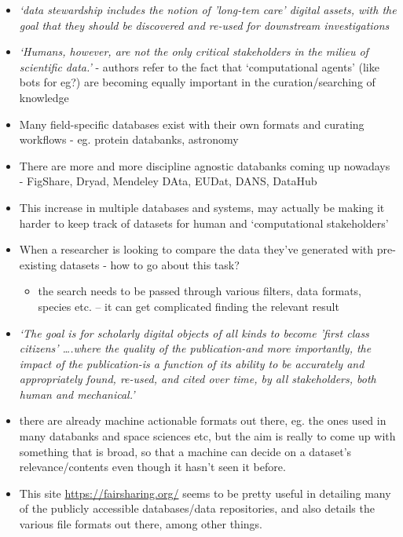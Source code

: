 \documentclass[
]{book}
\providecommand{\tightlist}{%
  \setlength{\itemsep}{0pt}\setlength{\parskip}{0pt}}
\begin{document}
\begin{itemize}
\tightlist
\item
  \emph{`data stewardship includes the notion of 'long-tem care' digital assets, with the goal that they should be discovered and re-used for downstream investigations}
\item
  \emph{`Humans, however, are not the only critical stakeholders in the milieu of scientific data.'} - authors refer to the fact that `computational agents' (like bots for eg?) are becoming equally important in the curation/searching of knowledge
\item
  Many field-specific databases exist with their own formats and curating workflows - eg. protein databanks, astronomy
\item
  There are more and more discipline agnostic databanks coming up nowadays - FigShare, Dryad, Mendeley DAta, EUDat, DANS, DataHub
\item
  This increase in multiple databases and systems, may actually be making it harder to keep track of datasets for human and `computational stakeholders'
\item
  When a researcher is looking to compare the data they've generated with pre-existing datasets - how to go about this task?

  \begin{itemize}
  \tightlist
  \item
    the search needs to be passed through various filters, data formats, species etc. -- it can get complicated finding the relevant result
  \end{itemize}
\item
  \emph{`The goal is for scholarly digital objects of all kinds to become 'first class citizens' \ldots.where the quality of the publication-and more importantly, the impact of the publication-is a function of its ability to be accurately and appropriately found, re-used, and cited over time, by all stakeholders, both human and mechanical.'}
\item
  there are already machine actionable formats out there, eg. the ones used in many databanks and space sciences etc, but the aim is really to come up with something that is broad, so that a machine can decide on a dataset's relevance/contents even though it hasn't seen it before.
\item
  This site \url{https://fairsharing.org/} seems to be pretty useful in detailing many of the publicly accessible databases/data repositories, and also details the various file formats out there, among other things.
\end{itemize}
\end{document}

